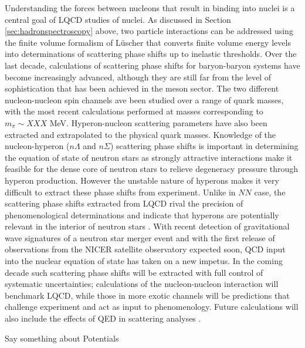 Understanding the  forces between nucleons that result in binding into nuclei is a central goal of LQCD studies of nuclei. As discussed in Section \ref{sec:hadronspectroscopy} above, two particle interactions can be addressed using the finite volume formalism of L\"uscher that converts finite volume energy levels into determinations of scattering phase shifts up to inelastic thresholds. Over the last decade, calculations of scattering phase shifts for baryon-baryon systems have become increasingly advanced, although they are still far from the level of sophistication that has been achieved in the meson sector. The two different nucleon-nucleon spin channels ave been studied over a range of quark masses, with the most recent calculations  performed at masses corresponding to $m_\pi\sim XXX$ MeV. Hyperon-nucleon scattering parameters have also been extracted and extrapolated to the physical quark masses.  
Knowledge of the nucleon-hyperon ($n\Lambda$ and $n\Sigma$) scattering phase shifts is  important in determining the equation of state of neutron stars as strongly attractive interactions make it feasible for the dense core of neutron stars to relieve degeneracy pressure through hyperon production. However the unstable nature of hyperons makes it very difficult to extract these phase shifts from experiment. Unlike in $NN$ case, the scattering phase shifts extracted from LQCD rival the precision of phenomenological determinations and indicate that hyperons are potentially relevant in the interior of neutron stars \cite{Beane:2012ey,Wagman:2017tmp}. With recent detection of gravitational wave signatures of a  neutron star merger event and with the first release of observations from the NICER satellite observatory expected soon, QCD input into the nuclear equation of state has taken on a new impetus. In the coming decade such scattering phase shifts will be extracted with full control of systematic uncertainties; calculations of the nucleon-nucleon interaction will benchmark LQCD, while those in more exotic channels will be predictions that challenge experiment and act as input to phenomenology. Future calculations will also include the effects of QED in scattering analyses \cite{Beane:2014qha}.

Say something about Potentials

